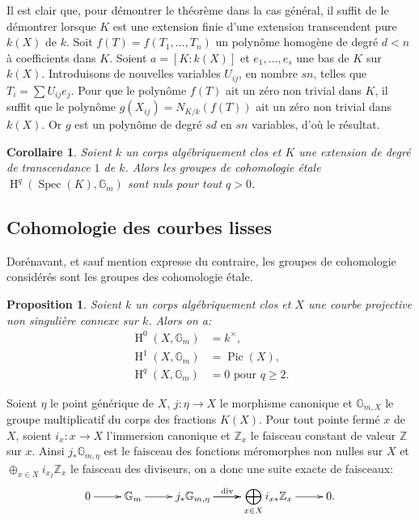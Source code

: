 \documentclass{book}
\DeclareMathOperator{\dv}{div}
\DeclareMathOperator{\h}{H}
\DeclareMathOperator{\pic}{Pic}
\DeclareMathOperator{\spec}{Spec}
\newcommand{\dG}{\mathbb{G}}
\newcommand{\dZ}{\mathbb{Z}}
\newtheorem{proposition}[subsubsection]{Proposition}
\newtheorem{corollary}[subsubsection]{Corollaire}
\begin{document}
Il est clair que, pour démontrer le théorème dans la cas général, il 
suffit de le démontrer lorsque $K$ est une extension finie d'une extension 
transcendent pure $k(X)$ de $k$. Soit $f(T)=f(T_1,\dotsc,T_n)$ un 
polynôme homogène de degré $d<n$ à coefficients dans $K$. Soient 
$a=[K:k(X)]$ et $e_1,\dotsc,e_s$ une bas de $K$ sur $k(X)$. Introduisons de 
nouvelles variables $U_{i j}$, en nombre $s n$, telles que 
$T_i=\sum U_{i j}e_j$. Pour que le polynôme $f(T)$ ait un zéro 
non trivial dans $K$, il suffit que le polynôme 
$g(X_{i j}) = N_{K/k}(f( T))$ ait un zéro non trivial dans $k(X)$. 
Or $g$ est un polynôme de degré $s d$ en $s n$ variables, d'où le 
résultat. 





\begin{corollary}\label{I:3-2-4}
  Soient $k$ un corps algébriquement clos et $K$ une extension de degré 
de transcendance $1$ de $k$. Alors les groupes de cohomologie étale 
$\h^q(\spec(K),\dG_m)$ sont nuls pour tout $q>0$. 
\end{corollary}










\subsection{Cohomologie des courbes lisses}

Dorénavant, et sauf mention expresse du contraire, les groupes de 
cohomologie considérés sont les groupes des cohomologie étale. 





\begin{proposition}\label{I:3-3-1}
Soient $k$ un corps algébriquement clos et $X$ une courbe projective non 
singulière connexe sur $k$. Alors on a:
\begin{align*}
  \h^0(X,\dG_m) &= k^\times \text{,} \\
  \h^1(X,\dG_m) &= \pic(X) \text{,} \\
  \h^q(X,\dG_m) &= 0 \text{ pour $q\geqslant 2$.}
\end{align*}
\end{proposition}

Soient $\eta$ le point générique de $X$, $j:\eta\to X$ le morphisme 
canonique et $\dG_{m,X}$ le groupe multiplicatif du corps des fractions 
$K(X)$. Pour tout pointe fermé $x$ de $X$, soient $i_x:x\to X$ l'immersion 
canonique et $\dZ_x$ le faisceau constant de valeur $\dZ$ sur $x$. Ainsi 
$j_*\dG_{m,\eta}$ est le faisceau des fonctions méromorphes non nulles sur 
$X$ et $\oplus_{x\in X} i_{x_I}\dZ_x$ le faisceau des diviseurs, on a donc une 
suite exacte de faisceaux:
\begin{equation}\label{I:eq:2}
\xymatrix{
  0 \ar[r] 
    & \dG_m \ar[r]
    & j_* \dG_{m,\eta} \ar[r]^-{\dv} \ar[r] 
    & \displaystyle\bigoplus_{x\in X} i_{x*} \dZ_x \ar[r] 
    & 0\text{.}
}
\end{equation}
\end{document}

